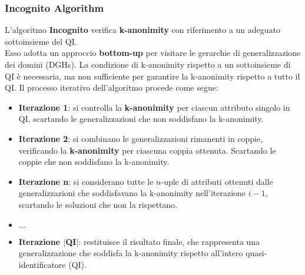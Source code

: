 \documentclass{report}
\begin{document}
\begin{center}
\end{center}

\subsubsection{Incognito Algorithm}
L'algoritmo \textbf{Incognito} verifica \textbf{k-anonimity} con riferimento a un adeguato sottoinsieme del QI. \\ 
Esso adotta un approccio \textbf{bottom-up} per visitare le gerarchie di generalizzazione dei domini (DGHs). 
La condizione di k-anonimity rispetto a un sottoinsieme di QI è necessaria, ma non sufficiente per garantire la k-anonimity rispetto a tutto il QI. 
Il processo iterativo dell'algoritmo procede come segue:

\begin{itemize}
    \item \textbf{Iterazione 1}: si controlla la \textbf{k-anonimity} per ciascun attributo singolo in QI, scartando le generalizzazioni che non soddisfano la k-anonimity.
    \item \textbf{Iterazione 2}: si combinano le generalizzazioni rimanenti in coppie, verificando la \textbf{k-anonimity} per ciascuna coppia ottenuta. Scartando le coppie che non soddisfano la k-anonimity.
    \item \textbf{Iterazione n}: si considerano tutte le $n$-uple di attributi ottenuti dalle generalizzazioni che soddisfavano la k-anonimity nell'iterazione $i-1$, scartando le soluzioni che non la rispettano.
    \item $\ldots$
    \item \textbf{Iterazione $|$QI$|$}: restituisce il risultato finale, che rappresenta una generalizzazione che soddisfa la k-anonimity rispetto all'intero quasi-identificatore (QI).
\end{itemize}
\end{document}
